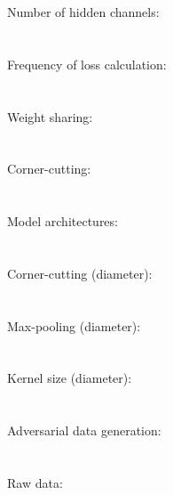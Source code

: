 \documentclass{article}
\begin{document}
Number of hidden channels:\\
\\\\

Frequency of loss calculation:\\
\\\\

Weight sharing:\\
\\\\

Corner-cutting:\\
\\\\

Model architectures:\\
\\\\

Corner-cutting (diameter):\\
\\\\

Max-pooling (diameter):\\
\\\\

Kernel size (diameter):\\
\\\\

Adversarial data generation:\\
\\\\

Raw data:\\

\end{document}
